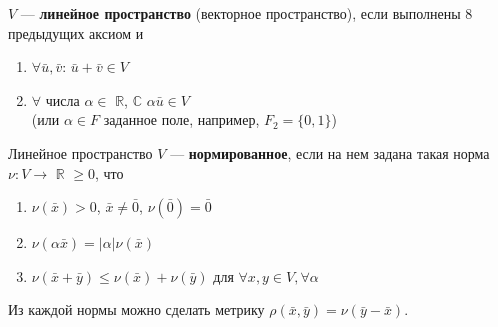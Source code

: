 \documentclass[12pt]{article}
\theoremstyle{definition}
\numberwithin{equation}{section}
\begin{document}
$V$ --- \textbf{линейное пространство} (векторное пространство), если выполнены 8 предыдущих аксиом и \begin{enumerate}
\item $\forall \bar u, \bar v$: $\bar u + \bar v \in V$
\item $\forall$ числа $\alpha \in$ $\mathbb{R}$, $\mathbb{C}$ $\alpha \bar u \in V$\\ 
(или $\alpha \in F$ заданное поле, например, $F_2 = \{ 0, 1 \}$)\end{enumerate}
Линейное пространство $V$ --- \textbf{нормированное}, если на нем задана такая норма \\$\nu : V \to$ $\mathbb{R}$ $\geqslant 0$, что\begin{enumerate}
\item $\nu(\bar x) > 0$, $\bar x \neq \bar 0$, $\nu(\bar 0) = \bar 0$
\item $\nu(\alpha \bar x) = |\alpha|\nu(\bar x)$
\item $\nu(\bar x + \bar y) \leq \nu(\bar x) + \nu(\bar y)$ для $\forall x, y \in V, \forall \alpha$
\end{enumerate}
Из каждой нормы можно сделать метрику $\rho(\bar x, \bar y) = \nu(\bar y - \bar x)$.\\ \\
\end{document}
